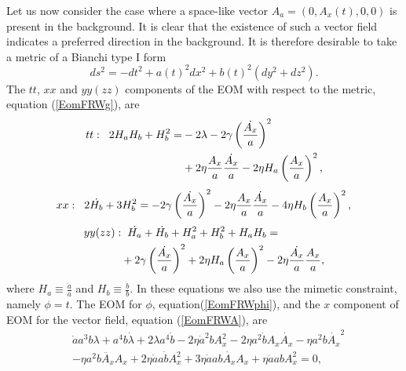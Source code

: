 \documentclass[%
 reprint,
 amsmath,amssymb,
 aps,
]{revtex4-1}
\begin{document}
Let us now consider the case where a space-like vector $A_a=(0,A_x(t),0,0)$ is present in the background. It is clear that the existence of such a vector field indicates a preferred direction in the background. It is therefore desirable to take a metric of a Bianchi type I form
\begin{equation}\label{biametric}
ds^2=-dt^2+a(t)^2dx^2+b(t)^2(dy^2+dz^2).
\end{equation}
The $tt$, $xx$ and $yy(zz)$ components of the EOM with respect to the metric, equation (\ref{EomFRWg}), are
\begin{equation}\label{biatt}
\begin{split}
tt:\hspace{2mm}2H_aH_b+H_b^2=&-2\lambda-2\gamma\left(\frac{\dot{A_x}}{a}\right)^2\\
&+2\eta\frac{A_x}{a}\frac{\dot{A_x}}{a}-2\eta H_a\left(\frac{A_x}{a}\right)^2,
\end{split}
\end{equation}
\begin{equation}\label{biaxx}
xx: \hspace{2mm}2\dot{H_b}+3H_b^2=-2\gamma\left(\frac{\dot{A_x}}{a}\right)^2-2\eta\frac{A_x}{a}\frac{\dot{A_x}}{a}-4\eta H_b \left(\frac{A_x}{a}\right)^2,
\end{equation}
\begin{equation}\label{biayy}
\begin{split}
yy(zz):&\hspace{2mm}\dot{H_a}+\dot{H_b}+H_a^2+H_b^2+H_a H_b=\\
&+2\gamma\left(\frac{\dot{A_x}}{a}\right)^2+2\eta H_a\left(\frac{A_x}{a}\right)^2-2\eta\frac{\dot{A_x}}{a}\frac{A_x}{a},
\end{split}
\end{equation}
where $H_a\equiv\frac{\dot{a}}{a}$ and $H_b\equiv\frac{\dot{b}}{b} $. In these equations we also use the mimetic constraint, namely $\phi=t$. The EOM for $\phi$, equation(\ref{EomFRWphi}), and the $x$ component of EOM for the vector field, equation (\ref{EomFRWA}), are
\begin{equation}\label{biaphi}
\begin{split}
&\dot{a}a^3 b\lambda +a^4b\dot{\lambda}+2\lambda a^4 \dot{b}-2\eta \dot{a}^2bA_x^2-2\eta a^2 \dot{b}A_x\dot{A_x}-\eta a^2b\dot{A_x}^2\\
&-\eta a^2 b\ddot{A_x}A_x+2\eta\dot{a}a\dot{b}A_x^2+3\eta\dot{a}a b \dot{A_x}A_x+\eta \ddot{a}a b A_x^2=0,
\end{split}
\end{equation}
\end{document}
